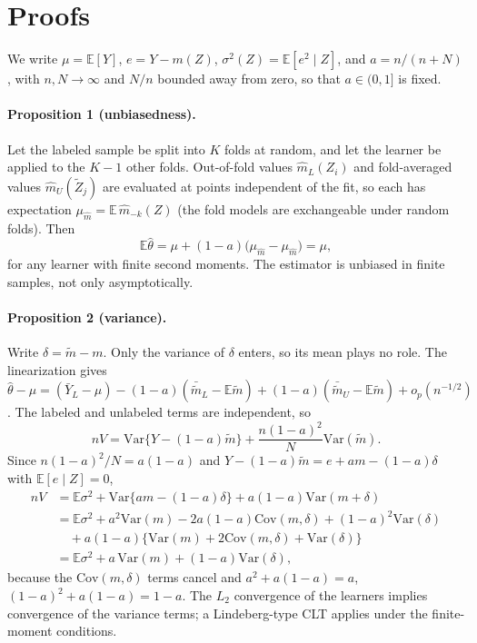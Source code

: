 \section{Proofs}
\label{app:proofs}

We write $\mu=\mathbb E[Y]$, $e=Y-m(Z)$, $\sigma^2(Z)=\mathbb E[e^2\mid Z]$, and $a=n/(n+N)$, with $n,N\to\infty$ and $N/n$ bounded away from zero, so that $a\in(0,1]$ is fixed.

\paragraph{Proposition 1 (unbiasedness).}
Let the labeled sample be split into $K$ folds at random, and let the learner be applied to the $K-1$ other folds. Out-of-fold values $\hat m_L(Z_i)$ and fold-averaged values $\hat m_U(\tilde Z_j)$ are evaluated at points independent of the fit, so each has expectation $\mu_{\hat m}=\mathbb E\,\hat m_{-k}(Z)$ (the fold models are exchangeable under random folds). Then
\[
\mathbb E\hat\theta=\mu+(1-a)\big(\mu_{\hat m}-\mu_{\hat m}\big)=\mu,
\]
for any learner with finite second moments. The estimator is unbiased in finite samples, not only asymptotically.

\paragraph{Proposition 2 (variance).}
Write $\delta=\tilde m-m$. Only the variance of $\delta$ enters, so its mean plays no role. The linearization gives $\hat\theta-\mu=(\bar Y_L-\mu)-(1-a)(\bar{\tilde m}_L-\mathbb E\tilde m)+(1-a)(\bar{\tilde m}_U-\mathbb E\tilde m)+o_p(n^{-1/2})$. The labeled and unlabeled terms are independent, so
\[
nV=\mathrm{Var}\{Y-(1-a)\tilde m\}+\frac{n(1-a)^2}{N}\mathrm{Var}(\tilde m).
\]
Since $n(1-a)^2/N=a(1-a)$ and $Y-(1-a)\tilde m=e+am-(1-a)\delta$ with $\mathbb E[e\mid Z]=0$,
\begin{align*}
nV&=\mathbb E\sigma^2+\mathrm{Var}\{am-(1-a)\delta\}+a(1-a)\mathrm{Var}(m+\delta)\\
&=\mathbb E\sigma^2+a^2\mathrm{Var}(m)-2a(1-a)\mathrm{Cov}(m,\delta)+(1-a)^2\mathrm{Var}(\delta)\\
&\quad+a(1-a)\{\mathrm{Var}(m)+2\mathrm{Cov}(m,\delta)+\mathrm{Var}(\delta)\}\\
&=\mathbb E\sigma^2+a\,\mathrm{Var}(m)+(1-a)\mathrm{Var}(\delta),
\end{align*}
because the $\mathrm{Cov}(m,\delta)$ terms cancel and $a^2+a(1-a)=a$, $(1-a)^2+a(1-a)=1-a$. The $L_2$ convergence of the learners implies convergence of the variance terms; a Lindeberg-type CLT applies under the finite-moment conditions.

